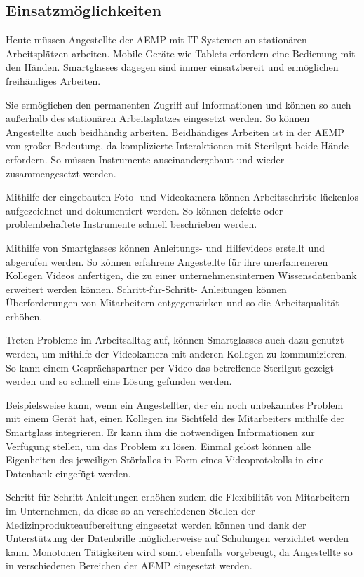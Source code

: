 \subsection{Einsatzmöglichkeiten}
\label{sec:Einsatzmoeglichkeiten}
Heute müssen Angestellte der AEMP mit IT-Systemen an stationären Arbeitsplätzen arbeiten. Mobile Geräte wie Tablets erfordern eine Bedienung mit den Händen. Smartglasses dagegen sind immer einsatzbereit und ermöglichen freihändiges Arbeiten. 

Sie ermöglichen den permanenten Zugriff auf Informationen und können so auch außerhalb des stationären Arbeitsplatzes eingesetzt werden. So können Angestellte auch beidhändig arbeiten. Beidhändiges Arbeiten ist in der AEMP von großer Bedeutung, da komplizierte Interaktionen mit Sterilgut beide Hände erfordern. So müssen Instrumente auseinandergebaut und wieder zusammengesetzt werden.

Mithilfe der eingebauten Foto- und Videokamera können Arbeitsschritte lückenlos aufgezeichnet und dokumentiert werden. So können defekte oder problembehaftete Instrumente schnell beschrieben werden.

Mithilfe von Smartglasses können Anleitungs- und Hilfevideos erstellt und abgerufen werden. So können erfahrene Angestellte für ihre unerfahreneren Kollegen Videos anfertigen, die zu einer unternehmensinternen Wissensdatenbank erweitert werden können. Schritt-für-Schritt- Anleitungen können Überforderungen von Mitarbeitern entgegenwirken und so die Arbeitsqualität erhöhen. 

Treten Probleme im Arbeitsalltag auf, können Smartglasses auch dazu genutzt werden, um mithilfe der Videokamera mit anderen Kollegen zu kommunizieren. So kann einem Gesprächspartner per Video das betreffende Sterilgut gezeigt werden und so schnell eine Lösung gefunden werden.

Beispielsweise kann, wenn ein Angestellter, der ein noch unbekanntes Problem mit einem Gerät hat, einen Kollegen ins Sichtfeld des Mitarbeiters mithilfe der Smartglass integrieren. Er kann ihm die notwendigen Informationen zur Verfügung stellen, um das Problem zu lösen. Einmal gelöst können alle Eigenheiten des jeweiligen Störfalles in Form eines Videoprotokolls in eine Datenbank eingefügt werden.

Schritt-für-Schritt Anleitungen erhöhen zudem die Flexibilität von Mitarbeitern im Unternehmen, da diese so an verschiedenen Stellen der Medizinprodukteaufbereitung eingesetzt werden können und dank der Unterstützung der Datenbrille möglicherweise auf Schulungen verzichtet werden kann. Monotonen Tätigkeiten wird somit ebenfalls vorgebeugt, da Angestellte so in verschiedenen Bereichen der AEMP eingesetzt werden.

